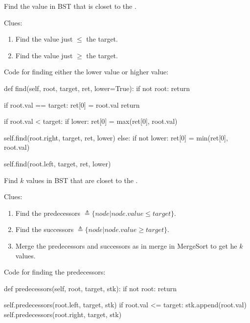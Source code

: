  Find the value in BST that is closet to the .

Clues:
\begin{enumerate}
\item Find the value just $\leq$ the target.
\item Find the value just $\geq$ the target.
\end{enumerate}

Code for finding either the lower value or higher value:
\begin{python}
def find(self, root, target, ret, lower=True):
  if not root:
    return

  if root.val == target:
    ret[0] = root.val
    return

  if root.val < target:
    if lower:
      ret[0] = max(ret[0], root.val)

    self.find(root.right, target, ret, lower)
  else:
    if not lower:
      ret[0] = min(ret[0], root.val)

    self.find(root.left, target, ret, lower)
\end{python}

 Find $k$ values in BST that are closet to the .

Clues:
\begin{enumerate}
\item Find the predecessors $\triangleq \{node | node.value \leq target\}$.
\item Find the successors $\triangleq \{node | node.value \geq target\}$.
\item Merge the predecessors and successors as in merge in MergeSort to get he $k$ values. 
\end{enumerate}

Code for finding the predecessors:
\begin{python}
def predecessors(self, root, target, stk):
  if not root:
    return

  self.predecessors(root.left, target, stk)
  if root.val <= target:
    stk.append(root.val)
    self.predecessors(root.right, target, stk)
\end{python}





